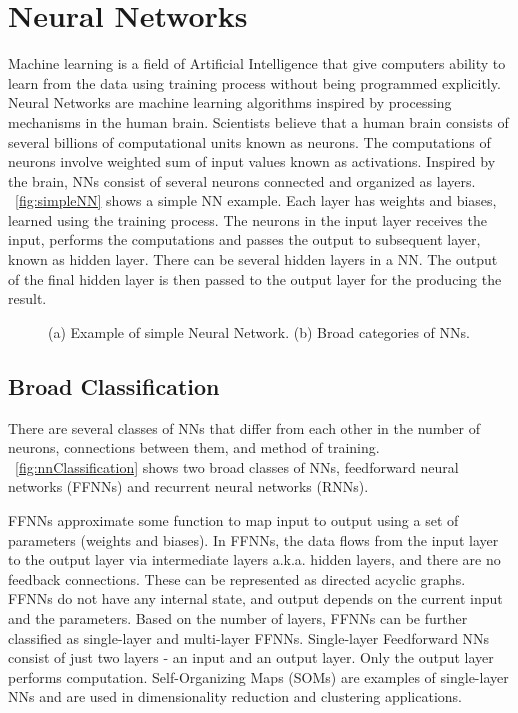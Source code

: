 \section{Neural Networks}
Machine learning is a field of Artificial Intelligence that give computers ability to learn from the data using training process without being programmed explicitly. Neural Networks are machine learning algorithms inspired by processing mechanisms in the human brain. Scientists believe that a human brain consists of several billions of computational units known as neurons. The computations of neurons involve weighted sum of input values known as activations. Inspired by the brain, NNs consist of several neurons connected and organized as layers. \figurename{~\ref{fig:simpleNN}} shows a simple NN example. Each layer has weights and biases, learned using the training process. The neurons in the input layer receives the input, performs the computations and passes the output to subsequent layer, known as hidden layer. There can be several hidden layers in a NN. The output of the final hidden layer is then passed to the output layer for the producing the result. 
\begin{figure}[!htb]
	\centering
	\captionsetup{font=sf}
	\hfil
	\hfil
	\caption{(a) Example of simple Neural Network. (b) Broad categories of NNs.}
	\label{fig:intro}
\end{figure}
\subsection{Broad Classification}
There are several classes of NNs that differ from each other in the number of neurons, connections between them, and method of training. \figurename{~\ref{fig:nnClassification}} shows two broad classes of NNs, feedforward neural networks (FFNNs) and recurrent neural networks (RNNs). 

FFNNs approximate some function to map input to output using a set of parameters (weights and biases). In FFNNs, the data flows from the input layer to the output layer via intermediate layers a.k.a. hidden layers, and there are no feedback connections. These can be represented as directed acyclic graphs. FFNNs do not have any internal state, and output depends on the current input and the parameters. Based on the number of layers, FFNNs can be further classified as single-layer and multi-layer FFNNs. Single-layer Feedforward NNs consist of just two layers - an input and an output layer. Only the output layer performs computation. Self-Organizing Maps (SOMs) are examples of single-layer NNs and are used in dimensionality reduction and clustering applications. 


